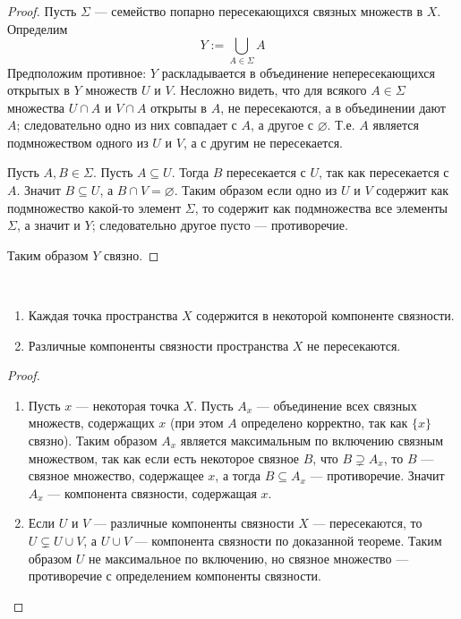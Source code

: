 \documentclass[12pt,a4paper]{article}
\begin{document}
    \begin{proof}
        Пусть $\Sigma$ --- семейство попарно пересекающихся связных множеств в $X$. Определим
        \[Y := \bigcup_{A \in \Sigma} A\]
        Предположим противное: $Y$ раскладывается в объединение непересекающихся открытых в $Y$ множеств $U$ и $V$. Несложно видеть, что для всякого $A \in \Sigma$ множества $U \cap A$ и $V \cap A$ открыты в $A$, не пересекаются, а в объединении дают $A$; следовательно одно из них совпадает с $A$, а другое с $\varnothing$. Т.е. $A$ является подмножеством одного из $U$ и $V$, а с другим не пересекается.

        Пусть $A, B \in \Sigma$. Пусть $A \subseteq U$. Тогда $B$ пересекается с $U$, так как пересекается с $A$. Значит $B \subseteq U$, а $B \cap V = \varnothing$. Таким образом если одно из $U$ и $V$ содержит как подмножество какой-то элемент $\Sigma$, то содержит как подмножества все элементы $\Sigma$, а значит и $Y$; следовательно другое пусто --- противоречие.

        Таким образом $Y$ связно.
    \end{proof}

    \begin{theorem}\ 
        \begin{enumerate}
            \item Каждая точка пространства $X$ содержится в некоторой компоненте связности.
            \item Различные компоненты связности пространства $X$ не пересекаются.
        \end{enumerate}
    \end{theorem}

    \begin{proof}
        \begin{enumerate}
            \item Пусть $x$ --- некоторая точка $X$. Пусть $A_x$ --- объединение всех связных множеств, содержащих $x$ (при этом $A$ определено корректно, так как $\{x\}$ связно). Таким образом $A_x$ является максимальным по включению связным множеством, так как если есть некоторое связное $B$, что $B \supsetneq A_x$, то $B$ --- связное множество, содержащее $x$, а тогда $B \subseteq A_x$ --- противоречие. Значит $A_x$ --- компонента связности, содержащая $x$.

            \item Если $U$ и $V$ --- различные компоненты связности $X$ --- пересекаются, то $U \subsetneq U \cup V$, а $U \cup V$ --- компонента связности по доказанной теореме. Таким образом $U$ не максимальное по включению, но связное множество --- противоречие с определением компоненты связности.
        \end{enumerate}
    \end{proof}
\end{document}
